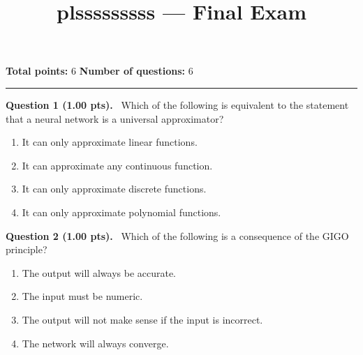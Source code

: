 \documentclass[12pt,a4paper]{article}
\title{plsssssssss — Final Exam}
\date{}
\begin{document}
\maketitle



\noindent
\textbf{Total points:} 6
\hfill
\textbf{Number of questions:} 6

\vspace{1em}
\hrule
\vspace{1.5em}


\noindent
\textbf{Question 1 (1.00 pts).}~
Which of the following is equivalent to the statement that a neural network is a universal approximator?


\begin{enumerate}[label=\textbf{\Alph*.}]

  \item It can only approximate linear functions.

  \item It can approximate any continuous function.

  \item It can only approximate discrete functions.

  \item It can only approximate polynomial functions.

\end{enumerate}



\vspace{0.5em}


\noindent
\textbf{Question 2 (1.00 pts).}~
Which of the following is a consequence of the GIGO principle?


\begin{enumerate}[label=\textbf{\Alph*.}]

  \item The output will always be accurate.

  \item The input must be numeric.

  \item The output will not make sense if the input is incorrect.

  \item The network will always converge.

\end{enumerate}



\vspace{0.5em}
\end{document}
